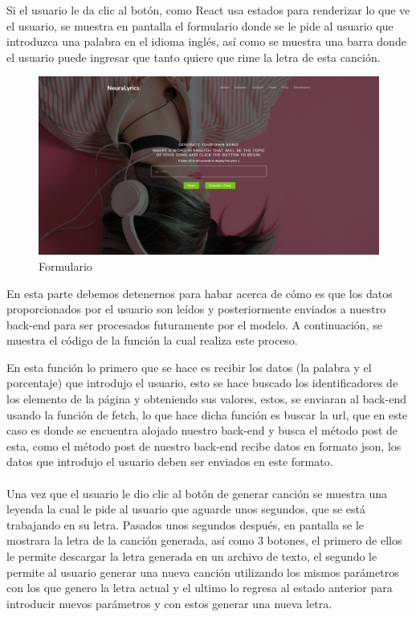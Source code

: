 \documentclass[12pt, a4paper, titlepage]{article}
\begin{document}
	Si el usuario le da clic al botón, como React usa estados para renderizar lo que ve el usuario, se muestra en pantalla el formulario donde se le pide al usuario que introduzca una palabra en el idioma inglés, así como se muestra una barra donde el usuario puede ingresar que tanto quiere que rime la letra de esta canción.
	\begin{figure}[H]
		\includegraphics[width=13.5cm]{./Imagenes/AplicacionWeb/pform.png}
		\centering 
		\caption{Formulario}
	\end{figure}
	En esta parte debemos detenernos para habar acerca de cómo es que los datos proporcionados por el usuario son leídos y posteriormente enviados a nuestro back-end para ser procesados futuramente por el modelo. A continuación, se muestra el código de la función la cual realiza este proceso.
	\begin{center}
		
	\end{center}
	En esta función lo primero que se hace es recibir los datos (la palabra y el porcentaje) que introdujo el usuario, esto se hace buscado los identificadores de los elemento de la página y obteniendo sus valores, estos, se enviaran al back-end usando la función de fetch, lo que hace dicha función es buscar la url, que en este caso es donde se encuentra alojado nuestro back-end y busca el método post de esta, como el método post de nuestro back-end recibe datos en formato json, los datos que introdujo el usuario deben ser enviados en este formato.\\\\
	Una vez que el usuario le dio clic al botón de generar canción se muestra una leyenda la cual le pide al usuario que aguarde unos segundos, que se está trabajando en su letra. Pasados unos segundos después, en pantalla se le mostrara la letra de la canción generada, así como 3 botones, el primero de ellos le permite descargar la letra generada en un archivo de texto, el segundo le permite al usuario generar una nueva canción utilizando los mismos parámetros con los que genero la letra actual y el ultimo lo regresa al estado anterior para introducir nuevos parámetros y con estos generar una nueva letra.
\end{document}
